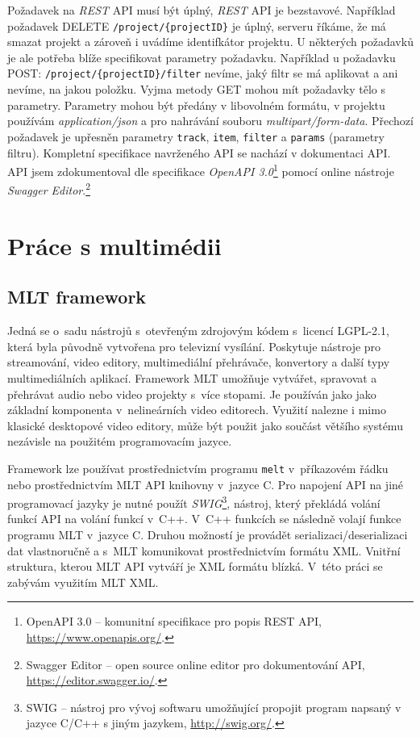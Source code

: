 Požadavek na \textit{REST} API musí být úplný, \textit{REST} API je bezstavové. Například požadavek DELETE \texttt{/project/\{projectID\}} je úplný, serveru říkáme, že má smazat projekt a zároveň i uvádíme identifkátor projektu. U některých požadavků je ale potřeba blíže specifikovat parametry požadavku. Například u požadavku POST: \texttt{/project/\{projectID\}/filter} nevíme, jaký filtr se má aplikovat a ani nevíme, na jakou položku. Vyjma metody GET mohou mít požadavky tělo s parametry. Parametry mohou být předány v libovolném formátu, v projektu používám \textit{application/json} a pro nahrávání souboru \textit{multipart/form-data}. Přechozí požadavek je upřesněn parametry \texttt{track}, \texttt{item}, \texttt{filter} a \texttt{params} (parametry filtru). Kompletní specifikace navrženého API se nachází v dokumentaci API. API jsem zdokumentoval dle specifikace \textit{OpenAPI 3.0}\footnote{OpenAPI 3.0 -- komunitní specifikace pro popis REST API, \url{https://www.openapis.org/}.} pomocí online nástroje \textit{Swagger Editor}.\footnote{Swagger Editor -- open source online editor pro dokumentování API, \url{https://editor.swagger.io/}.}

\chapter{Práce s multimédii}
\section{MLT framework}
Jedná se o~sadu nástrojů s~otevřeným zdrojovým kódem s~licencí LGPL-2.1, která byla původně vytvořena pro televizní vysílání. Poskytuje nástroje pro streamování, video editory, multimediální přehrávače, konvertory a další typy multimediálních aplikací. Framework MLT umožňuje vytvářet, spravovat a přehrávat audio nebo video projekty s~více stopami. Je používán jako jako základní komponenta v~nelineárních video editorech. Využití nalezne i mimo klasické desktopové video editory, může být použit jako součást většího systému nezávisle na použitém programovacím jazyce.

Framework lze používat prostřednictvím programu \texttt{melt} v~příkazovém řádku nebo prostřednictvím MLT API knihovny v~jazyce C. Pro napojení API na jiné programovací jazyky je nutné použít \textit{SWIG}\footnote{SWIG -- nástroj pro vývoj softwaru umožňující propojit program napsaný v jazyce C/C++ s jiným jazykem, \url{http://swig.org/}.}, nástroj, který překládá volání funkcí API na volání funkcí v~C++. V~C++ funkcích se následně volají funkce programu MLT v~jazyce C. Druhou možností je provádět serializaci/deserializaci dat vlastnoručně a s~MLT komunikovat prostřednictvím formátu XML. Vnitřní struktura, kterou MLT API vytváří je XML formátu blízká. V~této práci se zabývám využitím MLT XML.

